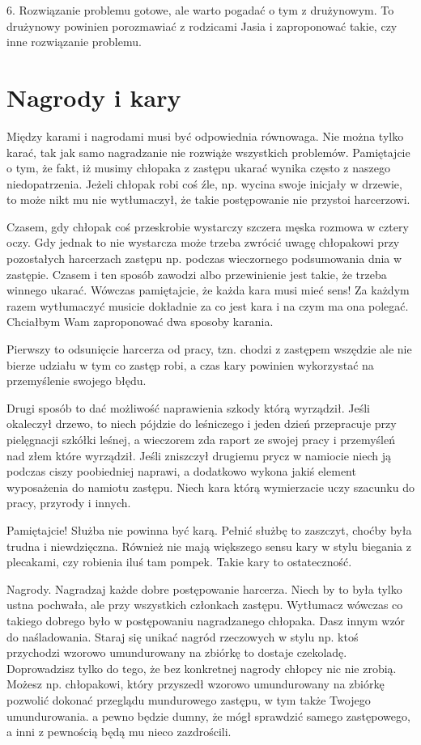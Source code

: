 6.
Rozwiązanie problemu gotowe, ale warto pogadać o tym z drużynowym. To drużynowy powinien porozmawiać  z rodzicami Jasia i zaproponować takie, czy inne rozwiązanie problemu.


\section{Nagrody i kary}
Między  karami i nagrodami musi być odpowiednia równowaga. Nie można tylko karać, tak jak samo nagradzanie nie rozwiąże wszystkich problemów. Pamiętajcie o tym, że fakt, iż musimy chłopaka z zastępu ukarać wynika często z naszego niedopatrzenia. Jeżeli chłopak robi coś źle, np. wycina swoje  inicjały w drzewie, to może nikt  mu nie  wytłumaczył, że  takie postępowanie nie przystoi harcerzowi.

Czasem, gdy chłopak coś przeskrobie wystarczy szczera męska rozmowa w cztery oczy. Gdy jednak to nie wystarcza może trzeba zwrócić uwagę chłopakowi przy pozostałych harcerzach zastępu  np. podczas wieczornego podsumowania dnia w zastępie. Czasem i ten sposób zawodzi albo przewinienie jest takie, że trzeba winnego  ukarać. Wówczas pamiętajcie, że każda kara musi mieć sens! Za każdym razem wytłumaczyć musicie dokładnie za  co  jest kara i na  czym  ma  ona polegać. Chciałbym Wam zaproponować dwa sposoby  karania.

Pierwszy to odsunięcie harcerza od pracy,  tzn. chodzi z zastępem wszędzie ale nie bierze udziału w tym co zastęp robi, a czas kary powinien wykorzystać na przemyślenie swojego błędu. 

Drugi sposób to dać możliwość naprawienia szkody którą wyrządził. Jeśli okaleczył drzewo, to niech pójdzie do leśniczego i jeden dzień przepracuje przy pielęgnacji szkółki leśnej, a wieczorem zda raport ze swojej pracy i przemyśleń nad złem które wyrządził. Jeśli zniszczył drugiemu prycz w namiocie niech ją podczas ciszy poobiedniej naprawi, a dodatkowo wykona jakiś element wyposażenia do namiotu zastępu. Niech kara którą wymierzacie uczy szacunku do pracy, przyrody i innych.

Pamiętajcie! Służba nie powinna być karą. Pełnić służbę to zaszczyt, choćby była trudna i niewdzięczna. Również nie mają większego sensu kary  w stylu biegania z plecakami, czy  robienia iluś tam pompek. Takie kary to ostateczność.

Nagrody. Nagradzaj każde dobre postępowanie harcerza. Niech by to była tylko ustna pochwała, ale przy  wszystkich członkach zastępu. Wytłumacz wówczas co takiego dobrego było w postępowaniu nagradzanego chłopaka. Dasz  innym wzór do naśladowania. Staraj się unikać nagród rzeczowych  w  stylu  np. ktoś przychodzi wzorowo umundurowany na zbiórkę to dostaje czekoladę. Doprowadzisz tylko do tego, że bez konkretnej nagrody chłopcy nic nie zrobią. Możesz np. chłopakowi, który przyszedł wzorowo umundurowany na zbiórkę pozwolić dokonać przeglądu mundurowego zastępu, w tym także Twojego  umundurowania.  a  pewno będzie  dumny, że mógł  sprawdzić   samego  zastępowego, a inni z pewnością będą mu nieco  zazdrościli.

